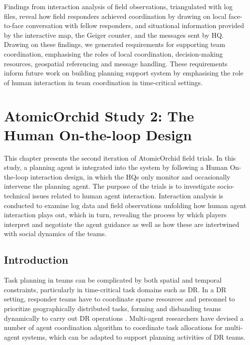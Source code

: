 Findings from interaction analysis of field observations, triangulated with log files, reveal how field responders achieved coordination by drawing on local face-to-face conversation with fellow responders, and situational information provided by the interactive map, the Geiger counter, and the messages sent by HQ. Drawing on these findings, we generated requirements for supporting team coordination, emphasising the roles of local coordination, decision-making resources, geospatial referencing and message handling. These requirements inform future work on building planning support system by emphasising the role of human interaction in team coordination in time-critical settings.\\

\chapter{AtomicOrchid Study 2: The Human On-the-loop Design}\label{ch:studytwo} %
This chapter presents the second iteration of AtomicOrchid field trials. In this study, a planning agent is integrated into the system by following a Human On-the-loop interaction design, in which the HQs only monitor and occasionally intervene the planning agent. The purpose of the trials is to investigate socio-technical issues related to human agent interaction. Interaction analysis is conducted to examine log data and field observations unfolding how human agent interaction plays out, which in turn, revealing the process by which players interpret and negotiate the agent guidance as well as how these are intertwined with social dynamics of the teams.

\section{Introduction}\label{sec:studytwointroduction}
Task planning in teams can be complicated by both spatial and temporal constraints, particularly in time-critical task domains such as \acf{DR}. In a \ac{DR} setting, responder teams have to coordinate sparse resources and personnel to prioritize geographically distributed tasks, forming and disbanding teams dynamically to carry out \ac{DR} operations \cite{Chen2005}. Multi-agent researchers have devised a number of agent coordination algorithm to coordinate task allocations for multi-agent systems, which can be adapted to support planning activities of \ac{DR} teams. \\


